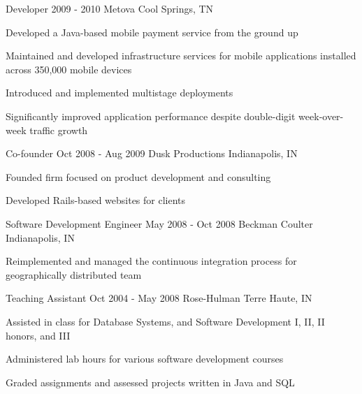{\begin{cventries}
  \cventry
  {Developer}
  {2009 - 2010}
  {Metova}
  {Cool Springs, TN}
  {
    \begin{cvitems}
      \item Developed a Java-based mobile payment service from the ground up
      \item Maintained and developed infrastructure services for mobile applications installed across 350,000 mobile devices
      \item Introduced and implemented multistage deployments
      \item Significantly improved application performance despite double-digit week-over-week traffic growth
    \end{cvitems}
    \cvtags{\tagJava \tagMySQL \tagTDDShort \tagECommerce}
  }

  \cventry
  {Co-founder}
  {Oct 2008 - Aug 2009}
  {Dusk Productions}
  {Indianapolis, IN}
  {
    \begin{cvitems}
      \item Founded firm focused on product development and consulting
      \item Developed Rails-based websites for clients
    \end{cvitems}
    \cvtags{
      \tagRuby
      \tagRails
      \tagHTML
      \tagJavaScript
      \tagMySQL
      \tagTDDShort
      \tagECommerce
      \tagProjectManagement
    }
  }

  \cventry
  {Software Development Engineer}
  {May 2008 - Oct 2008}
  {Beckman Coulter}
  {Indianapolis, IN}
  {
    \begin{cvitems}
      \item Reimplemented and managed the continuous integration process for geographically distributed team
    \end{cvitems}
    \cvtags{
      \tagCSharp
      \tagCIShort
      \tagTDDShort
    }
  }

  \cventry
  {Teaching Assistant}
  {Oct 2004 - May 2008}
  {Rose-Hulman}
  {Terre Haute, IN}
  {
    \begin{cvitems}
      \item Assisted in class for Database Systems, and Software Development I, II, II honors, and III
      \item Administered lab hours for various software development courses
      \item Graded assignments and assessed projects written in Java and SQL
    \end{cvitems}
    \cvtags{
      \tagJava
      \tagMSSQL
      \tagMySQL
      \tagTeaching
    }
  }


\end{cventries}}

